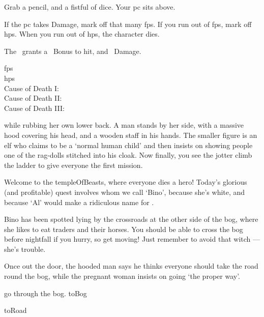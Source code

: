 \documentclass[10pt,twoside]{book}
\begin{document}

{
  \toggletrue{allyCharacter}
  \small
  \shortsword
  \noindent
  Grab a pencil, and a fistful of dice.
  Your \gls{pc} sits above.

  If the \gls{pc} takes Damage, mark off that many \glspl{fp}.
  If you run out of \glspl{fp}, mark off \glspl{hp}.
  When you run out of \glspl{hp}, the character dies.

  The \weaponName\ grants a ~Bonus to hit, and ~Damage.


  \begin{description}
    \item[\Glspl{fp}]
    \fpStat
    \item[\Glspl{hp}]
    \hpStat
    \item[Cause of Death I:]
    \bigLine
    \item[Cause of Death II:]
    \bigLine
    \item[Cause of Death III:]
    \bigLine
  \end{description}

}

\pagebreak
\pagestyle{minizine}

while rubbing her own lower back.
A man stands by her side, with a massive hood covering his head, and a wooden staff in his hands.
The smaller figure is an elf who claims to be a `normal human child' and then insists on showing people one of the rag-dolls stitched into his cloak.
Now finally, you see the \gls{jotter} climb the ladder to give everyone the first mission.

\begin{speechtext}
  Welcome to the \gls{templeOfBeasts}, where everyone dies a hero!
  Today's glorious (and profitable) quest involves  whom we call `Bino', because she's white, and because `Al' would make a ridiculous name for .

  Bino has been spotted lying by the crossroads at the other side of the bog, where she likes to eat traders and their horses.
  You should be able to cross the bog before nightfall if you hurry, so get moving!
  Just remember to avoid that \gls{witch} --- she's trouble.
\end{speechtext}

Once out the door, the hooded man says he thinks everyone should take the road round the bog, while the pregnant woman insists on going `the proper way'.

\begin{selectPath}
  {go through the bog.}%
  {toBog}

  {}%
  {toRoad}
\end{selectPath}
\end{document}
